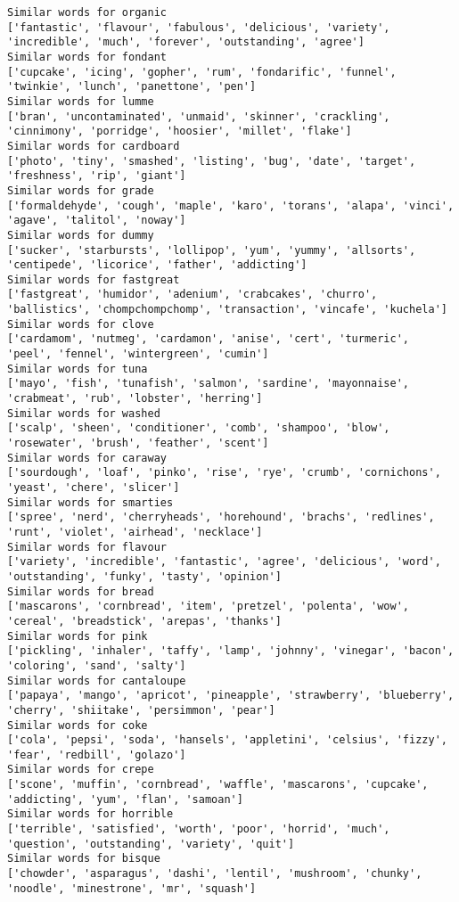 \documentclass[11pt]{article}
\begin{document}
\begin{Verbatim}[commandchars=\\\{\}]
Similar words for organic
['fantastic', 'flavour', 'fabulous', 'delicious', 'variety', 'incredible', 'much', 'forever', 'outstanding', 'agree']
Similar words for fondant
['cupcake', 'icing', 'gopher', 'rum', 'fondarific', 'funnel', 'twinkie', 'lunch', 'panettone', 'pen']
Similar words for lumme
['bran', 'uncontaminated', 'unmaid', 'skinner', 'crackling', 'cinnimony', 'porridge', 'hoosier', 'millet', 'flake']
Similar words for cardboard
['photo', 'tiny', 'smashed', 'listing', 'bug', 'date', 'target', 'freshness', 'rip', 'giant']
Similar words for grade
['formaldehyde', 'cough', 'maple', 'karo', 'torans', 'alapa', 'vinci', 'agave', 'talitol', 'noway']
Similar words for dummy
['sucker', 'starbursts', 'lollipop', 'yum', 'yummy', 'allsorts', 'centipede', 'licorice', 'father', 'addicting']
Similar words for fastgreat
['fastgreat', 'humidor', 'adenium', 'crabcakes', 'churro', 'ballistics', 'chompchompchomp', 'transaction', 'vincafe', 'kuchela']
Similar words for clove
['cardamom', 'nutmeg', 'cardamon', 'anise', 'cert', 'turmeric', 'peel', 'fennel', 'wintergreen', 'cumin']
Similar words for tuna
['mayo', 'fish', 'tunafish', 'salmon', 'sardine', 'mayonnaise', 'crabmeat', 'rub', 'lobster', 'herring']
Similar words for washed
['scalp', 'sheen', 'conditioner', 'comb', 'shampoo', 'blow', 'rosewater', 'brush', 'feather', 'scent']
Similar words for caraway
['sourdough', 'loaf', 'pinko', 'rise', 'rye', 'crumb', 'cornichons', 'yeast', 'chere', 'slicer']
Similar words for smarties
['spree', 'nerd', 'cherryheads', 'horehound', 'brachs', 'redlines', 'runt', 'violet', 'airhead', 'necklace']
Similar words for flavour
['variety', 'incredible', 'fantastic', 'agree', 'delicious', 'word', 'outstanding', 'funky', 'tasty', 'opinion']
Similar words for bread
['mascarons', 'cornbread', 'item', 'pretzel', 'polenta', 'wow', 'cereal', 'breadstick', 'arepas', 'thanks']
Similar words for pink
['pickling', 'inhaler', 'taffy', 'lamp', 'johnny', 'vinegar', 'bacon', 'coloring', 'sand', 'salty']
Similar words for cantaloupe
['papaya', 'mango', 'apricot', 'pineapple', 'strawberry', 'blueberry', 'cherry', 'shiitake', 'persimmon', 'pear']
Similar words for coke
['cola', 'pepsi', 'soda', 'hansels', 'appletini', 'celsius', 'fizzy', 'fear', 'redbill', 'golazo']
Similar words for crepe
['scone', 'muffin', 'cornbread', 'waffle', 'mascarons', 'cupcake', 'addicting', 'yum', 'flan', 'samoan']
Similar words for horrible
['terrible', 'satisfied', 'worth', 'poor', 'horrid', 'much', 'question', 'outstanding', 'variety', 'quit']
Similar words for bisque
['chowder', 'asparagus', 'dashi', 'lentil', 'mushroom', 'chunky', 'noodle', 'minestrone', 'mr', 'squash']

\end{Verbatim}
\end{document}
